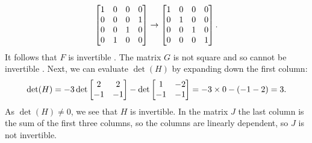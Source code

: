 \documentclass[a4paper]{article}
\begin{document}
\begin{solution}
\begin{itemize}
\[      \left[\begin{matrix} 1&0&0&0 \\ 0&0&0&1 \\ 0&0&1&0 \\ 0&1&0&0 \end{matrix}\right] \to 
      \left[\begin{matrix} 1&0&0&0 \\ 0&1&0&0 \\ 0&0&1&0 \\ 0&0&0&1 \end{matrix}\right].
   \]
   It follows that $F$ is invertible . The matrix $G$
   is not square and so cannot be invertible \mk.  Next, we can
   evaluate $\det(H)$ by expanding down the first column:
   \[ \det(H) = 
       -3\det\left[\begin{matrix} 2&2\\-1&-1\end{matrix}\right] - \det\left[\begin{matrix} 1&-2\\-1&-1\end{matrix}\right] 
       = -3\times 0 - (-1-2) = 3.
   \]
   As $\det(H)\neq 0$, we see that $H$ is invertible.
   In the matrix $J$ the last column is the sum of the first three
   columns, so the columns are linearly dependent, so $J$ is not
   invertible. 
 \end{itemize}
\end{solution}
\end{document}
